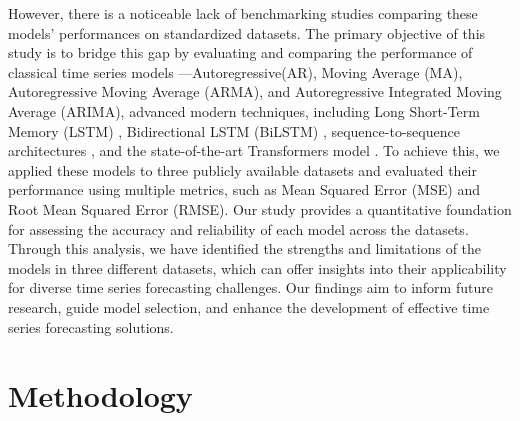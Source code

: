 \documentclass[sn-mathphys-num]{sn-jnl}
\theoremstyle{thmstyleone}%
\theoremstyle{thmstyletwo}%
\theoremstyle{thmstylethree}%
\begin{document}
However, there is a noticeable lack of benchmarking studies comparing these models' performances on standardized datasets. The primary objective of this study is to bridge this gap by evaluating and comparing the performance of classical time series models \cite{box2015time}—Autoregressive(AR), Moving Average (MA), Autoregressive Moving Average (ARMA), and Autoregressive Integrated Moving Average (ARIMA), advanced modern techniques, including Long Short-Term Memory (LSTM) \cite{hochreiter1997lstm}, Bidirectional LSTM (BiLSTM) \cite{graves2005framewise}, sequence-to-sequence architectures \cite{sutskever2014seq2seq}, and the state-of-the-art Transformers model \cite{vaswani2017attention}. To achieve this, we applied these models to three publicly available datasets and evaluated their performance using multiple metrics, such as Mean Squared Error (MSE) and Root Mean Squared Error (RMSE). Our study provides a quantitative foundation for assessing the accuracy and reliability of each model across the datasets. Through this analysis, we have identified the strengths and limitations of the models in three different datasets, which can offer insights into their applicability for diverse time series forecasting challenges. Our findings aim to inform future research, guide model selection, and enhance the development of effective time series forecasting solutions.

\section{Methodology}
\end{document}
